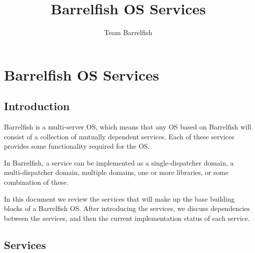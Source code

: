 \documentclass[a4paper,twoside]{report} %
\title{Barrelfish OS Services}   %
\author{Team Barrelfish}	%
\begin{document}
\maketitle

%
%
\begin{versionhistory}
\end{versionhistory}





\chapter{Barrelfish OS Services}\label{chap:services}

\section{Introduction}\label{sec:intro}

Barrelfish is a multi-server OS, which means that any OS based on
Barrelfish will consist of a collection of mutually dependent
services.  Each of these services provides some functionality required
for the OS.

In Barrelfish, a service can be implemented as a single-dispatcher
domain, a multi-dispatcher domain, multiple domains, one or more
libraries, or some combination of these.

In this document we review the services that will make up the base
building blocks of a Barrelfish OS.  After introducing the services,
we discuss dependencies between the services, and then the current
implementation status of each service.



\section{Services}\label{sec:services}
\end{document}

